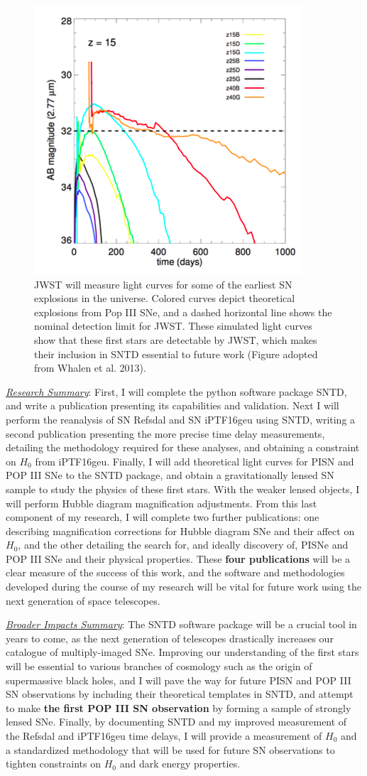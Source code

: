 \begin{figure}
\centering
\includegraphics[height=.35\textwidth]{FIG/JWST_high_z}
\caption{
\noindent\fontsize{10}{14}\selectfont
JWST will measure light curves for some of the earliest SN explosions
in the universe. Colored curves depict theoretical explosions from Pop
III SNe, and a dashed horizontal line shows the nominal detection
limit for JWST. These simulated light curves show that these first
stars are detectable by JWST, which makes their inclusion in SNTD
essential to future work (Figure adopted from Whalen et al. 2013\cite{Whalen:2013}).}
\end{figure}

\noindent\underline{\textit{Research Summary}}:
First, I will complete the python software package SNTD, and write a
publication presenting its capabilities and validation. Next I will
perform the reanalysis of SN Refsdal and SN iPTF16geu using SNTD,
writing a second publication presenting the more precise time delay
measurements, detailing the methodology required for these analyses,
and obtaining a constraint on $H_0$ from iPTF16geu. Finally, I will
add theoretical light curves for PISN and POP III SNe to the SNTD
package, and obtain a gravitationally lensed SN sample to study the
physics of these first stars. With the weaker lensed objects, I will
perform Hubble diagram magnification adjustments. From this last
component of my research, I will complete two further publications:
one describing magnification corrections for Hubble diagram SNe and
their affect on $H_0$, and the other detailing the search for, and
ideally discovery of, PISNe and POP III SNe and their physical
properties. These \textbf{four publications} will be a clear measure of the
success of this work, and the software and methodologies developed
during the course of my research will be vital for future work
using the next generation of space telescopes.

\noindent\underline{\textit{Broader Impacts Summary}}:
The SNTD software package will be a crucial tool in years to come, as
the next generation of telescopes drastically increases our catalogue
of multiply-imaged SNe. Improving our understanding of the first stars
will be essential to various branches of cosmology such as the origin
of supermassive black holes, and I will pave the way for future PISN
and POP III SN observations by including their theoretical templates
in SNTD, and attempt to make \textbf{the first POP III SN observation}
by forming a sample of strongly lensed SNe. Finally, by documenting
SNTD and my improved measurement of the Refsdal and iPTF16geu time
delays, I will provide a measurement of $H_0$ and a standardized
methodology that will be used for future SN observations to tighten
constraints on $H_0$ and dark energy properties.

